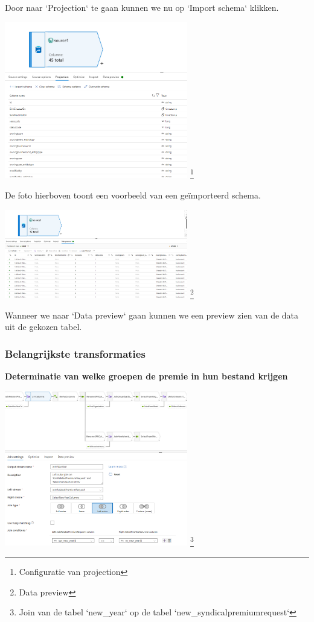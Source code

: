 Door naar `Projection` te gaan kunnen we nu op `Import schema` klikken.

\begin{center}
    \includegraphics[width=0.6\textwidth]{./graphics/adf/source_table_7_specific.png}
    \footnote{Configuratie van projection}
\end{center}

De foto hierboven toont een voorbeeld van een geïmporteerd schema.

\begin{center}
    \includegraphics[width=0.6\textwidth]{./graphics/adf/source_table_8_specific.png}
    \footnote{Data preview}
\end{center}

Wanneer we naar `Data preview` gaan kunnen we een preview zien van de data uit de gekozen tabel.

\subsubsection{Belangrijkste transformaties}

\textbf{Determinatie van welke groepen de premie in hun bestand krijgen}

\begin{center}
    \includegraphics[width=0.6\textwidth]{./graphics/adf/bepalen_groep_1.png}
    \footnote{Join van de tabel `new\_year` op de tabel `new\_syndicalpremiumrequest`}
\end{center}

